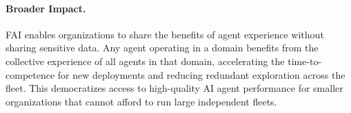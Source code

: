 \paragraph{Broader Impact.}
FAI enables organizations to share the benefits of agent experience without
sharing sensitive data. Any agent operating in a domain benefits from the
collective experience of all agents in that domain, accelerating the
time-to-competence for new deployments and reducing redundant exploration
across the fleet. This democratizes access to high-quality AI agent performance
for smaller organizations that cannot afford to run large independent fleets.

\appendix

